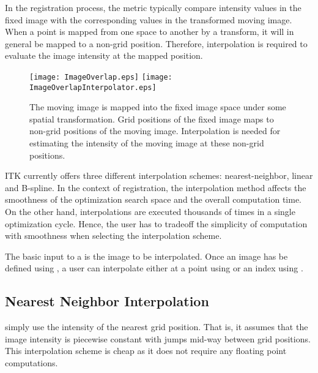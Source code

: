 In the registration process, the metric typically compare intensity values 
in the fixed image with the corresponding values in the transformed moving
image. When a point is mapped from one space to another by a transform,
it will in general be mapped to a non-grid position. Therefore, interpolation
is required to evaluate the image intensity at the mapped position.

\begin{figure}
\center
\texttt{[image: ImageOverlap.eps]}
\texttt{[image: ImageOverlapInterpolator.eps]}
\caption{ The moving image is mapped into the fixed image space under some spatial
transformation. Grid positions of the fixed image maps to non-grid positions of the
moving image. Interpolation is needed for estimating the intensity of the
moving image at these non-grid positions.}
\label{fig:ImageOverlapInterpolator}
\end{figure}

ITK currently offers three different interpolation schemes: nearest-neighbor,
linear and B-spline. In the context of registration, the interpolation method
affects the smoothness of the optimization search space and the overall
computation time. On the other hand, interpolations are executed thousands of
times in a single optimization cycle. Hence, the user has to tradeoff the
simplicity of computation with smoothness when selecting the interpolation 
scheme.

The basic input to a  is the image to
be interpolated. Once an image has be defined using ,
a user can interpolate either at a point using  or
an index using .
 
\subsection{Nearest Neighbor Interpolation}
\label{sec:NearestNeighborInterpolation}
 simply use the intensity of
the nearest grid position. That is, it assumes that the image intensity
is piecewise constant with jumps mid-way between grid positions. 
This interpolation scheme is cheap as it does not require any 
floating point computations.

